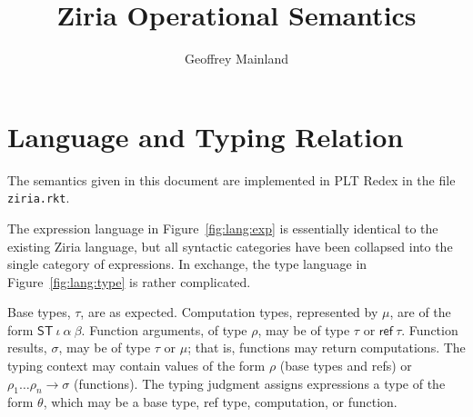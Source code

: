 \documentclass[twocolumn]{article}
\title{Ziria Operational Semantics}
\author{Geoffrey Mainland}
\newcommand{\kw}[1]{\textsf{#1}}
\begin{document}
\maketitle

\section{Language and Typing Relation}

The semantics given in this document are implemented in PLT Redex in the file \texttt{ziria.rkt}.

The expression language in Figure~\ref{fig:lang:exp} is essentially identical to the
existing Ziria language, but all syntactic categories have been collapsed into
the single category of expressions. In exchange, the type language in
Figure~\ref{fig:lang:type} is rather complicated.

Base types, $\tau$, are as expected. Computation types, represented by $\mu$,
are of the form $\kw{ST}~ \iota~ \alpha~ \beta$. Function arguments, of type
$\rho$, may be of type $\tau$ or $\kw{ref}~ \tau$. Function results, $\sigma$,
may be of type $\tau$ or $\mu$; that is, functions may return computations. The
typing context may contain values of the form $\rho$ (base types and \kw{ref}s)
or $\rho_1 \ldots \rho_n \to \sigma$ (functions). The typing judgment assigns
expressions a type of the form $\theta$, which may be a base type, \kw{ref}
type, computation, or function.
\end{document}
